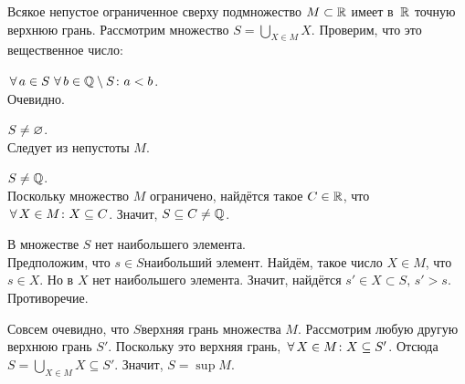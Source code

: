\documentclass[a4paper,12pt]{article}
\begin{document}
Всякое непустое ограниченное сверху подмножество $M \subset \mathbb{R}$ имеет в~$\mathbb{R}$ точную верхнюю грань.
Рассмотрим множество $S = \bigcup\limits_{X\in M}X$. Проверим, что это вещественное число:
\begin{nums}{-3}
\item
$\,\forall\, a\in S \, \,\forall\, b \in \mathbb{Q}\setminus S \colon a < b$.\\
Очевидно.
\item
$S \ne \varnothing$.\\
Следует из непустоты $M$.
\item
$S \ne \mathbb{Q}$.\\
Поскольку множество $M$ ограничено, найдётся такое $C \in \mathbb{R}$, что $\,\forall\, X \in M\colon X \subseteq C$. Значит, $S \subseteq C \ne \mathbb{Q}$.
\item
В множестве $S$ нет наибольшего элемента.\\
Предположим, что $s \in S$\т наибольший элемент. Найдём, такое число $X \in M$, что $s \in X$. Но в $X$ нет наибольшего элемента. Значит, найдётся $s' \in X\subset S,\, s' > s$. Противоречие.
\end{nums}

Совсем очевидно, что $S$\т верхняя грань множества $M$. Рассмотрим любую другую верхнюю грань $S'$. Поскольку это верхняя грань, $\,\forall\, X \in M\colon X \subseteq S'$. Отсюда $S = \bigcup\limits_{X\in M}X \subseteq S'$. Значит, $S = \sup M$.
\end{document}
